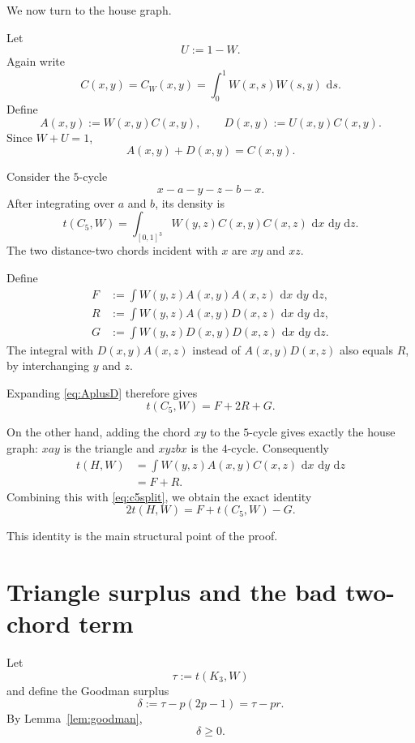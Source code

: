 \documentclass[11pt]{article}
\newcommand{\dd}{\,\mathrm{d}}
\begin{document}
We now turn to the house graph.

Let
\[
U:=1-W.
\]
Again write
\[
C(x,y)
=
C_W(x,y)
=
\int_0^1W(x,s)W(s,y)\,\dd s.
\]
Define
\[
A(x,y):=W(x,y)C(x,y),
\qquad
D(x,y):=U(x,y)C(x,y).
\]
Since \(W+U=1\),
\begin{equation}\label{eq:AplusD}
A(x,y)+D(x,y)=C(x,y).
\end{equation}

Consider the \(5\)-cycle
\[
x-a-y-z-b-x.
\]
After integrating over \(a\) and \(b\), its density is
\[
t(C_5,W)
=
\int_{[0,1]^3}
W(y,z)C(x,y)C(x,z)
\,\dd x\,\dd y\,\dd z.
\]
The two distance-two chords incident with \(x\) are \(xy\) and \(xz\).

Define
\[
\begin{aligned}
F
&:=
\int
W(y,z)A(x,y)A(x,z)
\,\dd x\,\dd y\,\dd z,\\
R
&:=
\int
W(y,z)A(x,y)D(x,z)
\,\dd x\,\dd y\,\dd z,\\
G
&:=
\int
W(y,z)D(x,y)D(x,z)
\,\dd x\,\dd y\,\dd z.
\end{aligned}
\]
The integral with \(D(x,y)A(x,z)\) instead of
\(A(x,y)D(x,z)\) also equals \(R\), by interchanging \(y\) and \(z\).

Expanding \eqref{eq:AplusD} therefore gives
\begin{equation}\label{eq:c5split}
t(C_5,W)=F+2R+G.
\end{equation}

On the other hand, adding the chord \(xy\) to the \(5\)-cycle gives
exactly the house graph: \(xay\) is the triangle and
\(xy z b x\) is the \(4\)-cycle.
Consequently
\[
\begin{aligned}
t(H,W)
&=
\int
W(y,z)A(x,y)C(x,z)
\,\dd x\,\dd y\,\dd z\\
&=
F+R.
\end{aligned}
\]
Combining this with \eqref{eq:c5split}, we obtain the exact identity
\begin{equation}\label{eq:key-decomposition}
\boxed{
2t(H,W)
=
F+t(C_5,W)-G.
}
\end{equation}

This identity is the main structural point of the proof.

\section{Triangle surplus and the bad two-chord term}

Let
\[
\tau:=t(K_3,W)
\]
and define the Goodman surplus
\[
\delta
:=
\tau-p(2p-1)
=
\tau-pr.
\]
By Lemma~\ref{lem:goodman},
\begin{equation}\label{eq:delta-nonneg}
\delta\ge0.
\end{equation}
\end{document}
